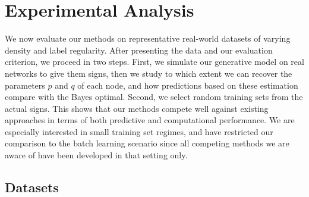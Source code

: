 \section{Experimental Analysis}\label{s:exp}

We now evaluate our \esp{} methods on representative real-world datasets of
varying density and label regularity.
After presenting the data and our evaluation criterion, we proceed in two steps. First, we simulate
our generative model on real networks to give them signs, then we study to which extent we can recover
the parameters $p$ and $q$ of each node, and how predictions based on these estimation compare with
the Bayes optimal. Second, we select random training sets from the actual signs.
This shows that our methods compete well against
existing approaches in terms of both predictive and computational performance. We are especially
interested in small training set regimes, and have restricted our comparison to the batch learning
scenario since all competing methods we are aware of have been developed in that setting only.

\subsection{Datasets}


